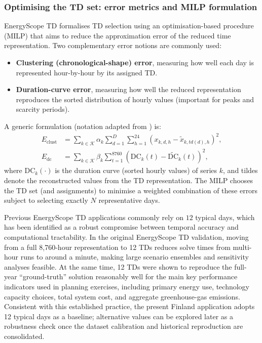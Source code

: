 \documentclass{article}
\begin{document}
\subsubsection{Optimising the TD set: error metrics and MILP formulation}
EnergyScope TD formalises TD selection using an optimisation-based procedure (MILP) that aims to reduce the approximation error of the reduced time representation. Two complementary error notions are commonly used:
\begin{itemize}
  \item \textbf{Clustering (chronological-shape) error}, measuring how well each day is represented hour-by-hour by its assigned TD.
  \item \textbf{Duration-curve error}, measuring how well the reduced representation reproduces the sorted distribution of hourly values (important for peaks and scarcity periods).
\end{itemize}
A generic formulation (notation adapted from \citet{limpensEnergyScopeTDNovel2019}) is:
\begin{align}
E_{\mathrm{clust}} &= \sum_{k \in \mathcal{K}} \alpha_k \sum_{d=1}^{D} \sum_{h=1}^{24} \left(x_{k,d,h} - \tilde{x}_{k,td(d),h}\right)^2, \\
E_{\mathrm{dc}} &= \sum_{k \in \mathcal{K}} \beta_k \sum_{t=1}^{8760} \left(\mathrm{DC}_k(t) - \widetilde{\mathrm{DC}}_k(t)\right)^2,
\end{align}
where $\mathrm{DC}_k(\cdot)$ is the duration curve (sorted hourly values) of series $k$, and tildes denote the reconstructed values from the TD representation. The MILP chooses the TD set (and assignments) to minimise a weighted combination of these errors subject to selecting exactly $N$ representative days.

Previous EnergyScope TD applications commonly rely on $12$ typical days, which has been identified as a robust compromise between temporal accuracy and computational tractability. In the original EnergyScope TD validation, moving from a full 8{,}760-hour representation to 12 TDs reduces solve times from multi-hour runs to around a minute, making large scenario ensembles and sensitivity analyses feasible. At the same time, 12 TDs were shown to reproduce the full-year ``ground-truth'' solution reasonably well for the main key performance indicators used in planning exercises, including primary energy use, technology capacity choices, total system cost, and aggregate greenhouse-gas emissions. Consistent with this established practice, the present Finland application adopts 12 typical days as a baseline; alternative values can be explored later as a robustness check once the dataset calibration and historical reproduction are consolidated.
\end{document}
